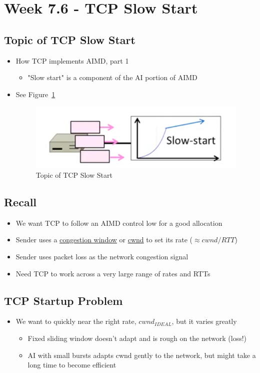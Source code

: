 \documentclass[12pt]{ctexart}   %
\begin{document}
\section{Week 7.6 - TCP Slow Start}
	\subsection{Topic of TCP Slow Start}
	\begin{itemize}
		\item How TCP implements AIMD, part 1
		\begin{itemize}
			\item "Slow start" is a component of the AI portion of AIMD
		\end{itemize}
		\item See Figure~\ref{fig:7-6-1}
		  
		 \begin{figure}[h!] %
		\centering
		 \includegraphics[scale=0.7]{images/7-6-1}
		\caption{ Topic of TCP Slow Start}
		 \label{fig:7-6-1}
		 \end{figure}	
	\end{itemize}
	
	\subsection{Recall}
	\begin{itemize}
		\item We want TCP to follow an AIMD control low for a good allocation
		\item Sender uses a \underline{congestion window} or \underline{cwnd} to set its rate ($\approx cwnd / RTT$)
		\item Sender uses packet loss as the network congestion signal
		\item Need TCP to work across a very large range of rates and RTTs
	\end{itemize}
	
	\subsection{TCP Startup Problem}
	\begin{itemize}
		\item We want to quickly near the right rate, $cwnd_{IDEAL}$, but it varies greatly
		\begin{itemize}
			\item Fixed sliding window doesn't adapt and is rough on the network (loss!)
			\item AI with small bursts adapts cwnd gently to the network, but might take a long time to become efficient
		\end{itemize}
	\end{itemize}
	
\end{document}

